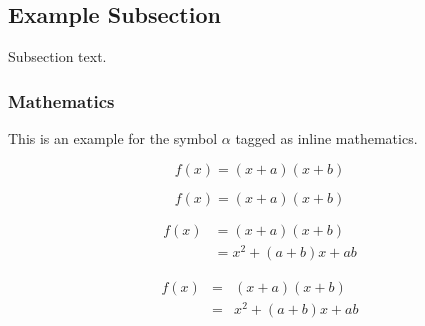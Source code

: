 \documentclass[preprint,12pt]{elsarticle}
\begin{document}
\subsection{Example Subsection}
\label{subsec1}

Subsection text.


\subsubsection{Mathematics}
This is an example for the symbol $\alpha$ tagged as inline mathematics.

\begin{equation}
f(x) = (x+a)(x+b)
\end{equation}

\begin{equation*}
f(x) = (x+a)(x+b)
\end{equation*}

\begin{align}
 f(x) &= (x+a)(x+b) \\
      &= x^2 + (a+b)x + ab
\end{align}

\begin{eqnarray}
 f(x) &=& (x+a)(x+b) \nonumber\\ %
      &=& x^2 + (a+b)x + ab
\end{eqnarray}
\end{document}

